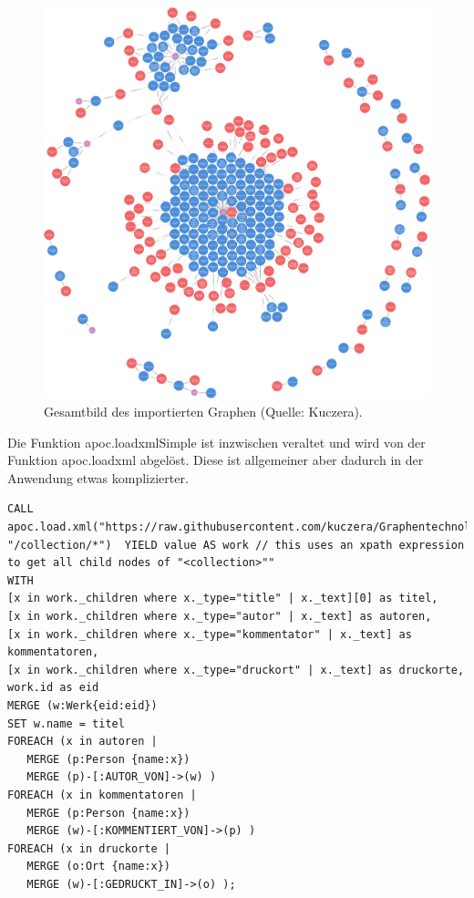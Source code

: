 \documentclass[12pt,ngerman,]{article}
\begin{document}
\begin{figure}
\centering
\includegraphics{Bilder/Kollatz-Druckernetzwerk.png}
\caption{Gesamtbild des importierten Graphen (Quelle: Kuczera).}
\end{figure}

Die Funktion apoc.loadxmlSimple ist inzwischen veraltet und wird von der
Funktion apoc.loadxml abgelöst. Diese ist allgemeiner aber dadurch in
der Anwendung etwas komplizierter.

\begin{verbatim}
CALL
apoc.load.xml("https://raw.githubusercontent.com/kuczera/Graphentechnologien/master/docs/data/kollatz.xml", "/collection/*")  YIELD value AS work // this uses an xpath expression to get all child nodes of "<collection>""
WITH
[x in work._children where x._type="title" | x._text][0] as titel,
[x in work._children where x._type="autor" | x._text] as autoren,
[x in work._children where x._type="kommentator" | x._text] as kommentatoren,
[x in work._children where x._type="druckort" | x._text] as druckorte,
work.id as eid
MERGE (w:Werk{eid:eid})
SET w.name = titel
FOREACH (x in autoren |
   MERGE (p:Person {name:x})
   MERGE (p)-[:AUTOR_VON]->(w) )
FOREACH (x in kommentatoren |
   MERGE (p:Person {name:x})
   MERGE (w)-[:KOMMENTIERT_VON]->(p) )
FOREACH (x in druckorte |
   MERGE (o:Ort {name:x})
   MERGE (w)-[:GEDRUCKT_IN]->(o) );
\end{verbatim}
\end{document}
